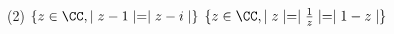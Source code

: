 %
%
	\begin{tasks}(2)
		\task $\{z \in \CC, \mid z-1 \mid = \mid z - i\mid\}$
		\task $\{z \in \CC, \mid z \mid = \mid \frac{1}{z}\mid = \mid 1 -z \mid\}$
	\end{tasks}

